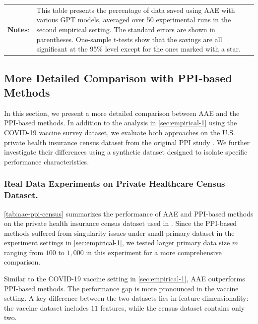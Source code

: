 \begin{table}[!t]
\begin{minipage}{15.5cm}
\vspace{3pt}
    \footnotesize
    \begin{tabular}{p{1cm} p{13cm}}
         \textbf{Notes}: & \setlength{\baselineskip}{1.2\baselineskip} 
    This table presents the percentage of data saved using AAE with various GPT models, averaged over 50 experimental runs in the second empirical setting. The standard errors are shown in parentheses. One-sample t-tests show that the savings are all significant at the 95\% level except for the ones marked with a star.
    \end{tabular}
  \end{minipage}
\end{table}



\subsection{More Detailed Comparison with PPI-based Methods}
\label{sec:empirical-2-aae-ppi}
In this section, we present a more detailed comparison between AAE and the PPI-based methods. In addition to the analysis in \cref{sec:empirical-1} using the COVID-19 vaccine survey dataset, we evaluate both approaches on the U.S. private health insurance census dataset from the original PPI study \citep{angelopoulos2023prediction}. We further investigate their differences using a synthetic dataset designed to isolate specific performance characteristics.

\subsubsection{Real Data Experiments on Private Healthcare Census Dataset.}
\cref{tab:aae-ppi-census} summarizes the performance of AAE and PPI-based methods on the private health insurance census dataset used in \cite{angelopoulos2023prediction}. Since the PPI-based methods suffered from singularity issues under small primary dataset in the experiment settings in \cref{sec:empirical-1}, we tested larger primary data size $m$ ranging from $100$ to $1{,}000$ in this experiment for a more comprehensive comparison.


Similar to the COVID-19 vaccine setting in \cref{sec:empirical-1}, AAE outperforms PPI-based methods. The performance gap is more pronounced in the vaccine setting. A key difference between the two datasets lies in feature dimensionality: the vaccine dataset includes $11$ features, while the census dataset contains only two. 

